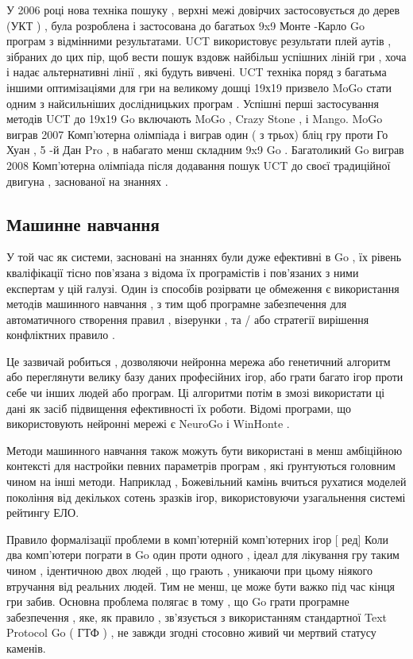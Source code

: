 У 2006 році нова техніка пошуку , верхні межі довірчих застосовується до дерев (УКТ ) , була розроблена і застосована до багатьох 9x9 Монте -Карло Go програм з відмінними результатами. UCT використовує результати плей аутів , зібраних до цих пір, щоб вести пошук вздовж найбільш успішних ліній гри , хоча і надає альтернативні лінії , які будуть вивчені. UCT техніка поряд з багатьма іншими оптимізаціями для гри на великому дошці 19х19 призвело MoGo стати одним з найсильніших дослідницьких програм . Успішні перші застосування методів UCT до 19х19 Go включають MoGo , Crazy Stone , і Mango. MoGo виграв 2007 Комп'ютерна олімпіада і виграв один ( з трьох) бліц гру проти Го Хуан , 5 -й Дан Pro , в набагато менш складним 9x9 Go . Багатоликий Go виграв 2008 Комп'ютерна олімпіада після додавання пошук UCT до своєї традиційної двигуна , заснованої на знаннях .

\subsection{Машинне навчання}
У той час як системи, засновані на знаннях були дуже ефективні в Go , їх рівень кваліфікації тісно пов'язана з відома їх програмістів і пов'язаних з ними експертам у цій галузі. Один із способів розірвати це обмеження є використання методів машинного навчання , з тим щоб програмне забезпечення для автоматичного створення правил , візерунки , та / або стратегії вирішення конфліктних правило .

Це зазвичай робиться , дозволяючи нейронна мережа або генетичний алгоритм або переглянути велику базу даних професійних ігор, або грати багато ігор проти себе чи інших людей або програм. Ці алгоритми потім в змозі використати ці дані як засіб підвищення ефективності їх роботи. Відомі програми, що використовують нейронні мережі є NeuroGo і WinHonte .

Методи машинного навчання також можуть бути використані в менш амбіційною контексті для настройки певних параметрів програм , які ґрунтуються головним чином на інші методи. Наприклад , Божевільний камінь вчиться рухатися моделей покоління від декількох сотень зразків ігор, використовуючи узагальнення системі рейтингу ЕЛО.

Правило формалізації проблеми в комп'ютерній комп'ютерних ігор [ ред] Коли два комп'ютери пограти в Go один проти одного , ідеал для лікування гру таким чином , ідентичною двох людей , що грають , уникаючи при цьому ніякого втручання від реальних людей. Тим не менш, це може бути важко під час кінця гри забив. Основна проблема полягає в тому , що Go грати програмне забезпечення , яке, як правило , зв'язується з використанням стандартної Text Protocol Go ( ГТФ ) , не завжди згодні стосовно живий чи мертвий статусу каменів.

